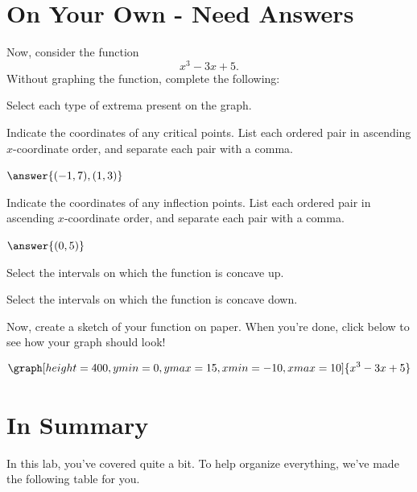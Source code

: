 \documentclass{ximera}
\begin{document}
\section{On Your Own - Need Answers}
\begin{question}
Now, consider the function $$x^3-3x+5\text{.}$$ Without graphing the function, complete the following:

Select each type of extrema present on the graph.
\begin{selectAll}
\end{selectAll}

Indicate the coordinates of any critical points. List each ordered pair in ascending $x$-coordinate order, and separate each pair with a comma.

$\answer{(-1,7),(1,3)}$

Indicate the coordinates of any inflection points. List each ordered pair in ascending $x$-coordinate order, and separate each pair with a comma.

$\answer{(0,5)}$

Select the intervals on which the function is concave up.

\begin{selectAll}
\choice{$[-5,10]$}
\choice{$[1,2]$}
\choice[correct]{$[0,\infty)$}
\choice{$(-\infty, 0]$}
\end{selectAll}

Select the intervals on which the function is concave down.

\begin{selectAll}
\choice{$[0,10]$}
\choice{$[1,2]$}
\choice{$[0,\infty)$}
\choice[correct]{$(-\infty,0]$}
\end{selectAll}

Now, create a sketch of your function on paper. When you're done, click below to see how your graph should look!

\begin{multipleChoice}
\end{multipleChoice}
\begin{feedback}[correct]
\[
\graph[height=400,ymin=0,ymax=15,xmin=-10,xmax=10]{x^3-3x+5}
\]
\end{feedback}
\end{question}

\section{In Summary}
In this lab, you've covered quite a bit. To help organize everything, we've made the following table for you.
\end{document}
